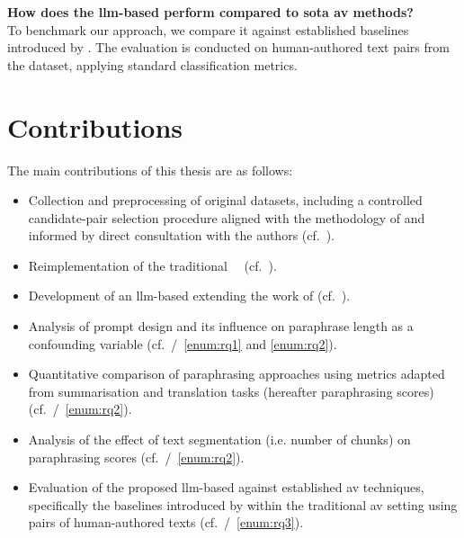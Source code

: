 \begin{questions}
    \item \textbf{How does the \ac{llm}-based \impAppr{} perform compared to \acl{sota} \ac{av} methods?} \label{enum:rq3} \hfill \\
    To benchmark our approach, we compare it against established baselines introduced by \citet{koppel_determining_2014}.
    The evaluation is conducted on human-authored text pairs from the \dataStudent{} dataset, applying standard classification metrics. 
    
\end{questions}



\section{Contributions}
\label{sec:contributions}
The main contributions of this thesis are as follows:
\begin{itemize}
    \item Collection and preprocessing of original datasets, including a controlled candidate-pair selection procedure aligned with the methodology of \citet{koppel_determining_2014} and informed by direct consultation with the authors (cf.~).
    \item Reimplementation of the traditional \impAppr{}~\citep{koppel_determining_2014}\ (cf.~).
    \item Development of an \ac{llm}-based \impAppr{} extending the work of \citet{koppel_determining_2014} (cf.~). 
    \item Analysis of prompt design and its influence on paraphrase length as a confounding variable (cf.~/~\ref{enum:rq1} and \ref{enum:rq2}).
    \item Quantitative comparison of paraphrasing approaches using metrics adapted from summarisation and translation tasks (hereafter paraphrasing scores) (cf.~/~\ref{enum:rq2}).
    \item Analysis of the effect of text segmentation (i.e. number of chunks) on paraphrasing scores (cf.~/~\ref{enum:rq2}).
    \item Evaluation of the proposed \ac{llm}-based \impAppr{} against established \ac{av} techniques, specifically the baselines introduced by \citet{koppel_determining_2014}
    within the traditional \ac{av} setting using pairs of human-authored texts (cf.~/~\ref{enum:rq3}).
   
\end{itemize}



